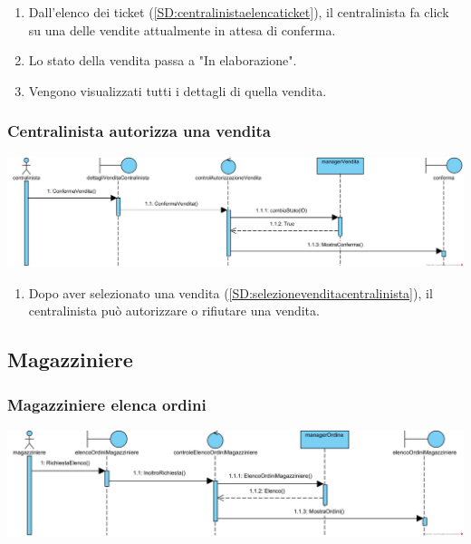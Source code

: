 \documentclass[12pt]{article}
\begin{document}
\begin{enumerate}
\item Dall'elenco dei ticket (\ref{SD:centralinistaelencaticket}), il centralinista fa click su una delle vendite attualmente in attesa di conferma.
\item Lo stato della vendita passa a "In elaborazione".
\item Vengono visualizzati tutti i dettagli di quella vendita.
\end{enumerate}

\subsubsection{Centralinista autorizza una vendita}
\label{SD:centralinistaautorizza}
\begin{center}
\includegraphics[width=\textwidth]{SequenceDiagram/CentralinistaVenditaAutorizza}
\end{center}

\begin{enumerate}
\item Dopo aver selezionato una vendita (\ref{SD:selezionevenditacentralinista}), il centralinista può autorizzare o rifiutare una vendita.
\end{enumerate}

\newpage

\subsection{Magazziniere}
\subsubsection{Magazziniere elenca ordini}
\label{SD:magazzinierevisualizzaelenco}
\begin{center}
\includegraphics[width=\textwidth]{SequenceDiagram/MagazziniereOrdiniElenco}
\end{center}
\end{document}
